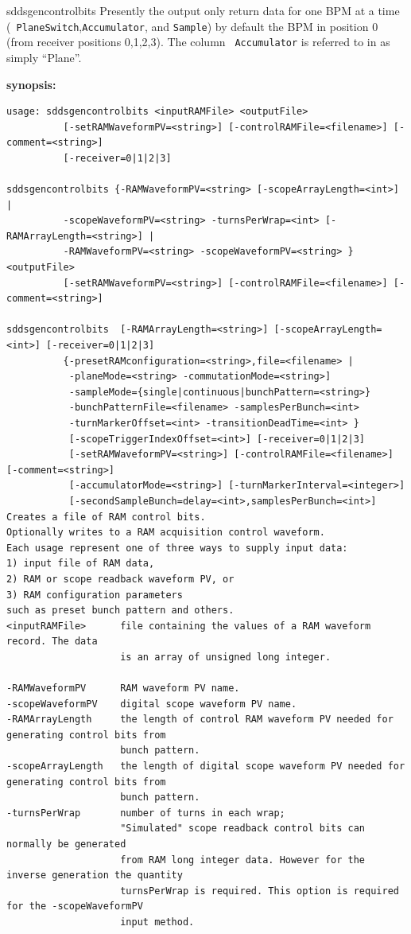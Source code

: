 \begin{sddsprog}{sddsgencontrolbits}
Presently the output only return data for one BPM at a time ({\tt
PlaneSwitch},{\tt Accumulator}, and {\tt Sample}) by default the BPM
in position 0 (from receiver positions 0,1,2,3). The column {\tt
Accumulator} is referred to in \cite{Norum2007} as simply ``Plane''.

\item \textbf{synopsis:}
\begin{verbatim}
usage: sddsgencontrolbits <inputRAMFile> <outputFile>
          [-setRAMWaveformPV=<string>] [-controlRAMFile=<filename>] [-comment=<string>] 
          [-receiver=0|1|2|3]

sddsgencontrolbits {-RAMWaveformPV=<string> [-scopeArrayLength=<int>] |
          -scopeWaveformPV=<string> -turnsPerWrap=<int> [-RAMArrayLength=<string>] |
          -RAMWaveformPV=<string> -scopeWaveformPV=<string> } <outputFile>
          [-setRAMWaveformPV=<string>] [-controlRAMFile=<filename>] [-comment=<string>]

sddsgencontrolbits  [-RAMArrayLength=<string>] [-scopeArrayLength=<int>] [-receiver=0|1|2|3]
          {-presetRAMconfiguration=<string>,file=<filename> |
           -planeMode=<string> -commutationMode=<string>]
           -sampleMode={single|continuous|bunchPattern=<string>}
           -bunchPatternFile=<filename> -samplesPerBunch=<int>
           -turnMarkerOffset=<int> -transitionDeadTime=<int> }
           [-scopeTriggerIndexOffset=<int>] [-receiver=0|1|2|3]
           [-setRAMWaveformPV=<string>] [-controlRAMFile=<filename>] [-comment=<string>]
           [-accumulatorMode=<string>] [-turnMarkerInterval=<integer>]
           [-secondSampleBunch=delay=<int>,samplesPerBunch=<int>]
Creates a file of RAM control bits.
Optionally writes to a RAM acquisition control waveform.
Each usage represent one of three ways to supply input data:
1) input file of RAM data,
2) RAM or scope readback waveform PV, or
3) RAM configuration parameters
such as preset bunch pattern and others.
<inputRAMFile>      file containing the values of a RAM waveform record. The data
                    is an array of unsigned long integer.

-RAMWaveformPV      RAM waveform PV name.
-scopeWaveformPV    digital scope waveform PV name.
-RAMArrayLength     the length of control RAM waveform PV needed for generating control bits from
                    bunch pattern.
-scopeArrayLength   the length of digital scope waveform PV needed for generating control bits from
                    bunch pattern.
-turnsPerWrap       number of turns in each wrap;
                    "Simulated" scope readback control bits can normally be generated
                    from RAM long integer data. However for the inverse generation the quantity 
                    turnsPerWrap is required. This option is required for the -scopeWaveformPV 
                    input method.


\end{verbatim}
\end{sddsprog}
